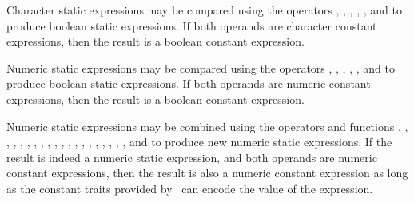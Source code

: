 Character static expressions may be compared using the operators \EXP{<},
\EXP{\leq}, \EXP{\geq}, \EXP{>},
\EXP{=}, and \EXP{\neq} to produce boolean static expressions.  If both
operands are character constant expressions, then the result is a boolean
constant expression.

Numeric static expressions may be compared using the operators \EXP{<},
\EXP{\leq}, \EXP{\geq}, \EXP{>},
\EXP{=}, and \EXP{\neq} to produce boolean static expressions.  If both
operands are numeric constant expressions, then the result is a boolean
constant expression.

Numeric static expressions may be combined using the operators and
functions \EXP{+},
\EXP{-}, \EXP{\times}, \EXP{\cdot}, \EXP{/}, \EXP{!}, , ,
\EXP{\surd}, , ,
, , \EXP{\gcd}, , \EXP{\sin},
\EXP{\cos}, \EXP{\tan}, \EXP{\arcsin}, \EXP{\arccos}, and \EXP{\arctan}
to produce new numeric static expressions.  If the result is indeed
a numeric static expression, and both operands are numeric constant
expressions, then the result is also a numeric constant expression
as long as the constant traits provided by \library\ can encode the value
of the expression.

